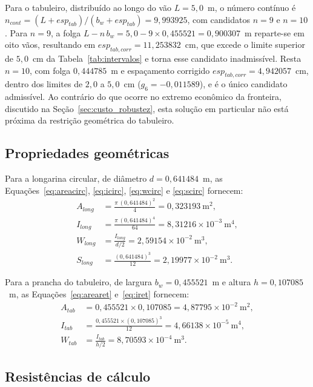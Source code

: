 \begin{appendices}
Para o tabuleiro, distribuído ao longo do vão $L = 5{,}0$~m, o número contínuo é $n_{cont} = (L + esp_{tab})/(b_w + esp_{tab}) = 9{,}993925$, com candidatos $n = 9$ e $n = 10$.
Para $n = 9$, a folga $L - n\,b_w = 5{,}0 - 9 \times 0{,}455521 = 0{,}900307$~m reparte-se em oito vãos, resultando em $esp_{tab,corr} = 11{,}253832$~cm, que excede o limite superior de $5{,}0$~cm da Tabela~\ref{tab:intervalos} e torna esse candidato inadmissível.
Resta $n = 10$, com folga $0{,}444785$~m e espaçamento corrigido $esp_{tab,corr} = 4{,}942057$~cm, dentro dos limites de $2{,}0$ a $5{,}0$~cm ($g_6 = -0{,}011589$), e é o único candidato admissível.
Ao contrário do que ocorre no extremo econômico da fronteira, discutido na Seção~\ref{sec:custo_robustez}, esta solução em particular não está próxima da restrição geométrica do tabuleiro.

\subsection{Propriedades geométricas}

Para a longarina circular, de diâmetro $d = 0{,}641484$~m, as Equações~\eqref{eq:areacirc}, \eqref{eq:icirc}, \eqref{eq:wcirc} e \eqref{eq:scirc} fornecem:
\begin{align*}
A_{long} &= \frac{\pi\,(0{,}641484)^2}{4} = 0{,}323193~\text{m}^2, \\
I_{long} &= \frac{\pi\,(0{,}641484)^4}{64} = 8{,}31216\times10^{-3}~\text{m}^4, \\
W_{long} &= \frac{I_{long}}{d/2} = 2{,}59154\times10^{-2}~\text{m}^3, \\
S_{long} &= \frac{(0{,}641484)^3}{12} = 2{,}19977\times10^{-2}~\text{m}^3.
\end{align*}

Para a prancha do tabuleiro, de largura $b_w = 0{,}455521$~m e altura $h = 0{,}107085$~m, as Equações~\eqref{eq:arearet} e~\eqref{eq:iret} fornecem:
\begin{align*}
A_{tab} &= 0{,}455521 \times 0{,}107085 = 4{,}87795\times10^{-2}~\text{m}^2, \\
I_{tab} &= \frac{0{,}455521 \times (0{,}107085)^3}{12} = 4{,}66138\times10^{-5}~\text{m}^4, \\
W_{tab} &= \frac{I_{tab}}{h/2} = 8{,}70593\times10^{-4}~\text{m}^3.
\end{align*}

\subsection{Resistências de cálculo}


\end{appendices}
